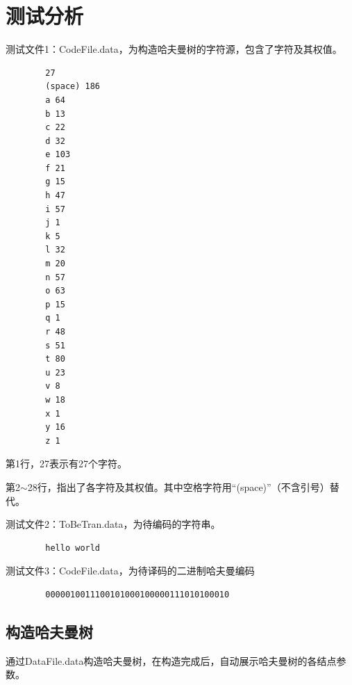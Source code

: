 \documentclass{ctexart}
\begin{document}
    \section{测试分析}
    测试文件1：CodeFile.data，为构造哈夫曼树的字符源，包含了字符及其权值。
    \begin{verbatim}
        27
        (space) 186
        a 64
        b 13
        c 22
        d 32
        e 103
        f 21
        g 15
        h 47
        i 57
        j 1
        k 5
        l 32
        m 20
        n 57
        o 63
        p 15
        q 1
        r 48
        s 51
        t 80
        u 23
        v 8
        w 18
        x 1
        y 16
        z 1
    \end{verbatim}
    
    第1行，27表示有27个字符。
    
    第2$\sim$28行，指出了各字符及其权值。其中空格字符用“(space)”（不含引号）替代。

    测试文件2：ToBeTran.data，为待编码的字符串。
    \begin{verbatim}
        hello world
    \end{verbatim}
    
    测试文件3：CodeFile.data，为待译码的二进制哈夫曼编码
    \begin{verbatim}
        0000010011100101000100000111010100010
    \end{verbatim}

    \subsection{构造哈夫曼树}
    通过DataFile.data构造哈夫曼树，在构造完成后，自动展示哈夫曼树的各结点参数。
    
\end{document}

